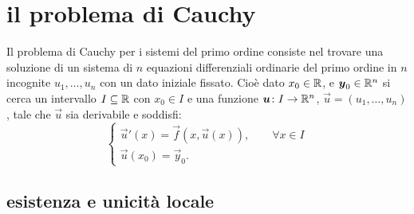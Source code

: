 \section{il problema di Cauchy}

Il problema di Cauchy per i sistemi del primo ordine
consiste nel
trovare una soluzione di un sistema di 
$n$ equazioni differenziali ordinarie del primo ordine in $n$ incognite
$u_1, \dots, u_n$
con un dato iniziale fissato. 
Cioè dato $x_0\in {\mathbb R}$,
e $\boldsymbol y_0 \in {\mathbb R}^n$ si cerca un intervallo $I\subseteq {\mathbb R}$ con $x_0\in I$ 
e una funzione $\boldsymbol u \colon I\to {\mathbb R}^n$,
$\vec u = (u_1, \dots, u_n)$, tale
che $\vec u$ sia derivabile e soddisfi:
\begin{equation}\label{eq:problema_cauchy}
\begin{cases}
 \vec u'(x) = \vec f(x, \vec u(x)), \qquad \forall x\in I\\
 \vec u(x_0) = \vec y_0.
\end{cases}
\end{equation}

\subsection{esistenza e unicità locale}

